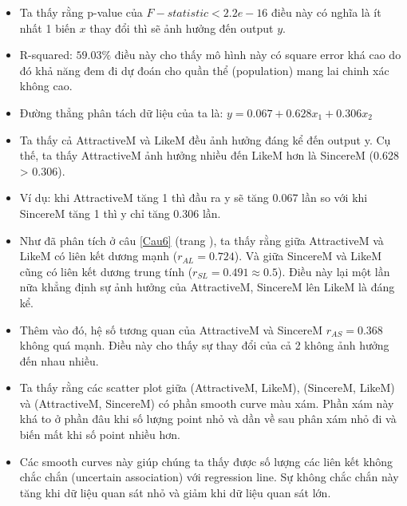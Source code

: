 \documentclass[a4paper,12pt]{article}
\begin{document}
	
	\begin{itemize}
		\item Ta thấy rằng p-value của $F-statistic < 2.2e-16$ điều này có nghĩa là ít nhất 1 biến $x$ thay đổi thì sẽ ảnh hưởng đến output $y$.
		\item R-squared: $59.03\%$ điều này cho thấy mô hình này có square error khá cao do đó khả năng đem đi dự đoán cho quần thể (population) mang lai chinh xác không cao.
		\item Đường thẳng phân tách dữ liệu của ta là: $y = 0.067 + 0.628x_1 + 0.306x_2$
		\item Ta thấy cả AttractiveM và LikeM đều ảnh hưởng đáng kể đến output y. Cụ thế, ta thấy AttractiveM ảnh hưởng nhiều đến LikeM hơn là SincereM (0.628 > 0.306).
		\item Ví dụ: khi AttractiveM tăng 1 thì đầu ra y sẽ tăng 0.067 lần so với khi SincereM tăng 1 thì y chỉ tăng 0.306 lần.
		\item Như đã phân tích ở câu \ref{Cau6} (trang \pageref{Cau6}), ta thấy rằng giữa AttractiveM và LikeM có liên kết dương mạnh ($r_{AL} = 0.724$). Và giữa SincereM và LikeM cũng có liên kết dương trung tính ($r_{SL} = 0.491 \approx 0.5$). Điều này lại một lần nữa khẳng định sự ảnh hưởng của AttractiveM, SincereM lên LikeM là đáng kể.
		\item Thêm vào đó, hệ số tương quan của AttractiveM và SincereM $r_{AS} = 0.368$ không quá mạnh. Điều này cho thấy sự thay đổi của cả 2 không ảnh hưởng đến nhau nhiều.
		\item Ta thấy rằng các scatter plot giữa (AttractiveM, LikeM), (SincereM, LikeM) và (AttractiveM, SincereM) có phần smooth curve màu xám. Phần xám này khá to ở phần đâu khi số lượng point nhỏ và dần về sau phân xám nhỏ đi và biến mất khi số point nhiều hơn.
		\item Các smooth curves này giúp chúng ta thấy được số lượng các liên kết không chắc chắn (uncertain association) với regression line. Sự không chắc chắn này tăng khi dữ liệu quan sát nhỏ và giảm khi dữ liệu quan sát lớn.
		
	\end{itemize}
	
\end{document}
